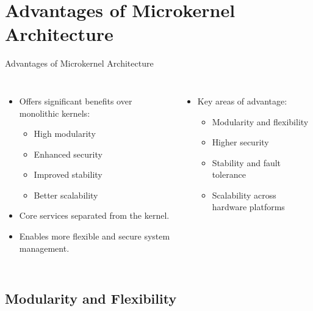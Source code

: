 \documentclass[aspectratio=169, table]{beamer}
\begin{document}
\section{Advantages of Microkernel Architecture}

\begin{frame}{Advantages of Microkernel Architecture}
\begin{columns}
\begin{itemize}
	\item Offers significant benefits over monolithic kernels:
	\begin{itemize}
		\item High modularity
		\item Enhanced security
		\item Improved stability
		\item Better scalability
	\end{itemize}
	\item Core services separated from the kernel.
	\item Enables more flexible and secure system management.
\end{itemize}
\begin{itemize}
	\item Key areas of advantage:
	\begin{itemize}
		\item Modularity and flexibility
		\item Higher security
		\item Stability and fault tolerance
		\item Scalability across hardware platforms
	\end{itemize}
\end{itemize}
\end{columns}
\end{frame}

\subsection{Modularity and Flexibility}
\end{document}
